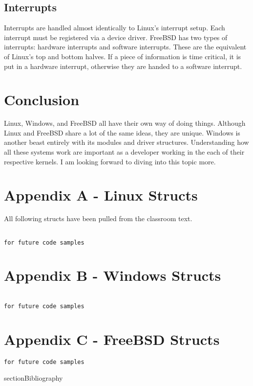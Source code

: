  \subsection{Interrupts}
 Interrupts are handled almost identically to Linux's interrupt setup. Each
 interrupt must be registered via a device driver. FreeBSD has two types of
 interrupts: hardware interrupts and software interrupts. These are the equivalent
 of Linux's top and bottom halves. If a piece of information is time critical,
 it is put in a hardware interrupt, otherwise they are handed to a software
 interrupt. \cite{freebsd2016}

\section{Conclusion}
Linux, Windows, and FreeBSD all have their own way of doing things. Although Linux
and FreeBSD share a lot of the same ideas, they are unique. Windows is another beast
entirely with its modules and driver structures. Understanding how all these systems
work are important as a developer working in the each of their respective kernels.
I am looking forward to diving into this topic more.

\clearpage
\section{Appendix A - Linux Structs}
All following structs have been pulled from the classroom text. \cite{robertlove2010}
\begin{lstlisting}

for future code samples

\end{lstlisting}

\section{Appendix B - Windows Structs}
\begin{lstlisting}

for future code samples
\end{lstlisting}
\section{Appendix C - FreeBSD Structs}
\begin{lstlisting}
for future code samples

\end{lstlisting}

section{Bibliography}
% 
% 
%
% 
